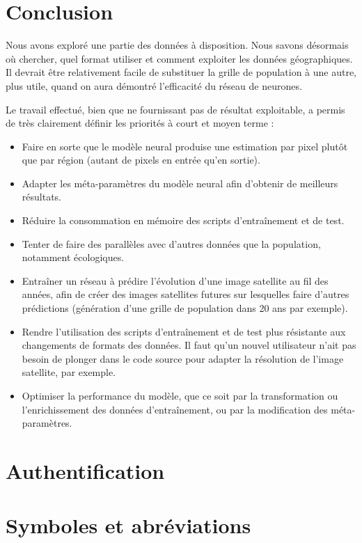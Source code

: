 \documentclass[a4paper, 11pt]{report}
\begin{document}
\chapter{Conclusion}
Nous avons exploré une partie des données à disposition. Nous savons désormais où chercher, quel format utiliser et comment exploiter les données géographiques. Il devrait être relativement facile de substituer la grille de population à une autre, plus utile, quand on aura démontré l'efficacité du réseau de neurones.

Le travail effectué, bien que ne fournissant pas de résultat exploitable, a permis de très clairement définir les priorités à court et moyen terme :
\begin{itemize}
	\item Faire en sorte que le modèle neural produise une estimation par pixel plutôt que par région (autant de pixels en entrée qu'en sortie).
	\item Adapter les méta-paramètres du modèle neural afin d'obtenir de meilleurs résultats.
	\item Réduire la consommation en mémoire des scripts d'entraînement et de test.
	\item Tenter de faire des parallèles avec d'autres données que la population, notamment écologiques.
	\item Entraîner un réseau à prédire l'évolution d'une image satellite au fil des années, afin de créer des images satellites futures sur lesquelles faire d'autres prédictions (génération d'une grille de population dans 20 ans par exemple).
	\item Rendre l'utilisation des scripts d'entraînement et de test plus résistante aux changements de formats des données. Il faut qu'un nouvel utilisateur n'ait pas besoin de plonger dans le code source pour adapter la résolution de l'image satellite, par exemple.
	\item Optimiser la performance du modèle, que ce soit par la transformation ou l'enrichissement des données d'entraînement, ou par la modification des méta-paramètres.
\end{itemize}

\printbibliography

\chapter{Authentification}

\chapter{Symboles et abréviations}

\listoffigures

\end{document}
